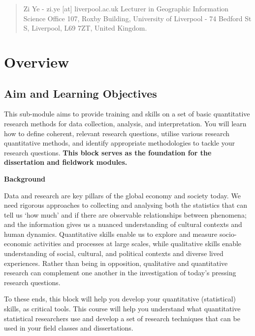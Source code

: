 \documentclass[
  letterpaper,
  DIV=11,
  numbers=noendperiod]{scrreprt}
\begin{document}
\begin{quote}
Zi Ye - zi.ye {[}at{]} liverpool.ac.uk Lecturer in Geographic
Information Science Office 107, Roxby Building, University of Liverpool
- 74 Bedford St S, Liverpool, L69 7ZT, United Kingdom.
\end{quote}


\chapter*{Overview}\label{overview}


\section*{Aim and Learning
Objectives}\label{aim-and-learning-objectives}


This sub-module aims to provide training and skills on a set of basic
quantitative research methods for data collection, analysis, and
interpretation. You will learn how to define coherent, relevant research
questions, utilise various research quantitative methods, and identify
appropriate methodologies to tackle your research questions.
\textbf{This block serves as the foundation for the dissertation and
fieldwork modules.}

\textbf{Background}

Data and research are key pillars of the global economy and society
today. We need rigorous approaches to collecting and analysing both the
statistics that can tell us `how much' and if there are observable
relationships between phenomena; and the information gives us a nuanced
understanding of cultural contexts and human dynamics. Quantitative
skills enable us to explore and measure socio-economic activities and
processes at large scales, while qualitative skills enable understanding
of social, cultural, and political contexts and diverse lived
experiences. Rather than being in opposition, qualitative and
quantitative research can complement one another in the investigation of
today's pressing research questions.

To these ends, this block will help you develop your quantitative
(statistical) skills, as critical tools. This course will help you
understand what quantitative statistical researchers use and develop a
set of research techniques that can be used in your field classes and
dissertations.
\end{document}
